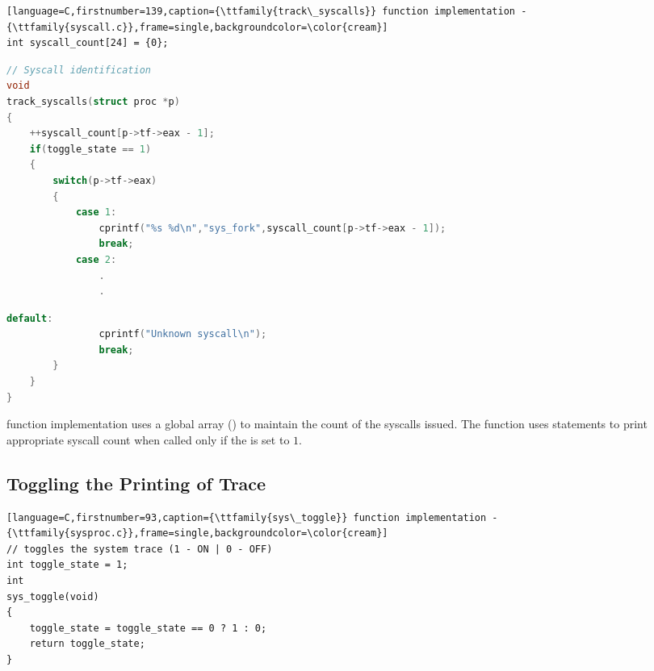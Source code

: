 \documentclass[12pt]{article}
\begin{document}
\begin{addmargin}[0.7in]{0in}
\begin{lstlisting}[language=C,firstnumber=139,caption={\ttfamily{track\_syscalls}} function implementation - {\ttfamily{syscall.c}},frame=single,backgroundcolor=\color{cream}]
int syscall_count[24] = {0};
\end{lstlisting}

\vspace{-\baselineskip}
\vspace{0.2mm}
\begin{lstlisting}[language=C,firstnumber=140,frame=single,backgroundcolor=\color{cream}]
// Syscall identification
void
track_syscalls(struct proc *p)
{   
    ++syscall_count[p->tf->eax - 1];
    if(toggle_state == 1)
    {
        switch(p->tf->eax)
        {
            case 1:
                cprintf("%s %d\n","sys_fork",syscall_count[p->tf->eax - 1]);
                break;
            case 2:
                .
                .
\end{lstlisting}

\begin{lstlisting}[language=C,firstnumber=221,frame=single,backgroundcolor=\color{cream}]
            default:
                cprintf("Unknown syscall\n");
                break;
        }
    }
}
\end{lstlisting}
\end{addmargin}

\vspace{5mm}
\begin{addmargin}[0.1in]{0in}
    {} function implementation uses a global array ({}) to maintain the count of the syscalls issued. The function uses {} statements to print appropriate syscall count when called only if the {} is set to $1$.
\end{addmargin}

\subsection*{Toggling the Printing of Trace}
\begin{addmargin}[0.7in]{0in}
\begin{lstlisting}[language=C,firstnumber=93,caption={\ttfamily{sys\_toggle}} function implementation - {\ttfamily{sysproc.c}},frame=single,backgroundcolor=\color{cream}]
// toggles the system trace (1 - ON | 0 - OFF)
int toggle_state = 1;
int
sys_toggle(void)
{
    toggle_state = toggle_state == 0 ? 1 : 0;
    return toggle_state;
}
\end{lstlisting}
\end{addmargin}
\end{document}
